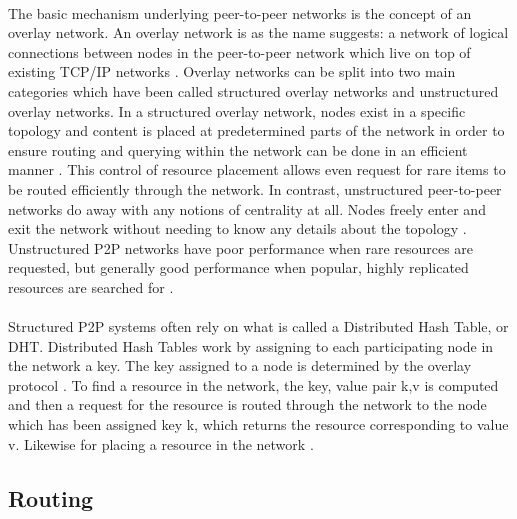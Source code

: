 \documentclass[12pt,letterpaper]{article}
\begin{document}
\paragraph{}

The basic mechanism underlying peer-to-peer networks is the concept of an overlay network.
An overlay network is as the name suggests: a network of logical connections between nodes in the peer-to-peer network which live on top of existing TCP/IP networks \cite{overlay}.
Overlay networks can be split into two main categories which have been called structured overlay networks and unstructured overlay networks.
In a structured overlay network, nodes exist in a specific topology and content is placed at predetermined parts of the network in order to ensure routing and querying within the network can be done in an efficient manner \cite{overlay}.
This control of resource placement allows even request for rare items to be routed efficiently through the network.
In contrast, unstructured peer-to-peer networks do away with any notions of centrality at all.
Nodes freely enter and exit the network without needing to know any details about the topology \cite{overlay}.
Unstructured P2P networks have poor performance when rare resources are requested, but generally good performance when popular, highly replicated resources are searched for \cite{overlay}.

\paragraph{}

Structured P2P systems often rely on what is called a Distributed Hash Table, or DHT. Distributed Hash Tables work by assigning to each participating node in the network a key.
The key assigned to a node is determined by the overlay protocol \cite{overlay}. To find a resource in the network, the key, value pair {k,v} is computed and then a request for the resource is routed through the network to the node which has been assigned key k, which returns the resource corresponding to value v.
Likewise for placing a resource in the network \cite{overlay}.

\subsection{Routing}

\paragraph{}
\end{document}
